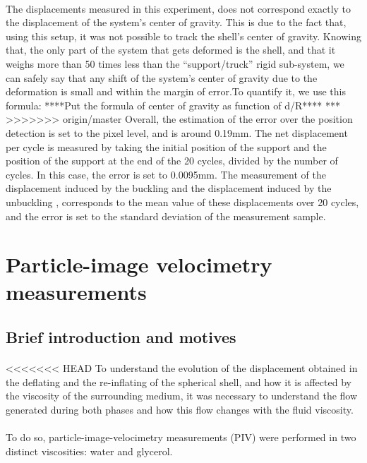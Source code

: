 \paragraph{}
The displacements measured in this experiment, does not correspond exactly to the displacement of the system's center of gravity. This is due to the fact that, using this setup, it was not possible to track the shell's center of gravity. Knowing that, the only part of the system that gets deformed is the shell, and that it weighs more than 50 times less than the "`support/truck"' rigid sub-system, we can safely say that any shift of the system's center of gravity due to the deformation is small and within the margin of error.To quantify it, we use this formula:
 ****Put the formula of center of gravity as function of d/R****
***   
>>>>>>> origin/master
Overall, the estimation of the error over the position detection is set to the pixel level, and is around 0.19mm. The net displacement per cycle is measured by taking the initial position of the support and the position of the support at the end of the 20 cycles, divided by the number of cycles. In this case, the error is set to 0.0095mm. The measurement of the displacement induced by the buckling and the displacement induced by the unbuckling , corresponds to the mean value of these displacements over 20 cycles, and the error is set to the standard deviation of the measurement sample.

\section{Particle-image velocimetry measurements}
\subsection{Brief introduction and motives}
\paragraph{}
<<<<<<< HEAD
To understand the evolution of the displacement obtained in the deflating and the re-inflating of the spherical shell, and how it is affected by the viscosity of the surrounding medium, it was necessary to understand the flow generated during both phases and how this flow changes with the fluid viscosity.
\paragraph{}
To do so, particle-image-velocimetry measurements (PIV) were performed in two distinct viscosities: water and glycerol.
